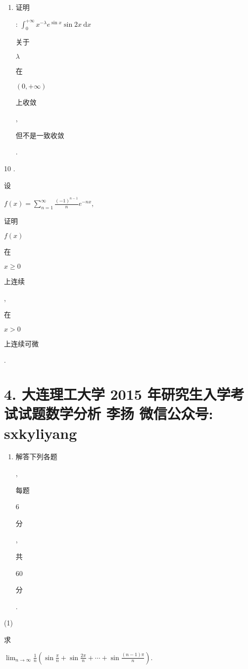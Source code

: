 \documentclass[10pt]{article}
\begin{document}
\begin{enumerate}
  \item \begin{CJK}{UTF8}{mj}证明\end{CJK}: $\int_{0}^{+\infty} x^{-\lambda} e^{\sin x} \sin 2 x \mathrm{~d} x$ \begin{CJK}{UTF8}{mj}关于\end{CJK} $\lambda$ \begin{CJK}{UTF8}{mj}在\end{CJK} $(0,+\infty)$ \begin{CJK}{UTF8}{mj}上收敛\end{CJK}, \begin{CJK}{UTF8}{mj}但不是一致收敛\end{CJK}.

\end{enumerate}
10 . \begin{CJK}{UTF8}{mj}设\end{CJK} $f(x)=\sum_{n=1}^{\infty} \frac{(-1)^{n-1}}{n} e^{-n x}$, \begin{CJK}{UTF8}{mj}证明\end{CJK} $f(x)$ \begin{CJK}{UTF8}{mj}在\end{CJK} $x \geqslant 0$ \begin{CJK}{UTF8}{mj}上连续\end{CJK}, \begin{CJK}{UTF8}{mj}在\end{CJK} $x>0$ \begin{CJK}{UTF8}{mj}上连续可微\end{CJK}.

\section{4. 大连理工大学 2015 年研究生入学考试试题数学分析 
 李扬 
 微信公众号: sxkyliyang}
\begin{enumerate}
  \item \begin{CJK}{UTF8}{mj}解答下列各题\end{CJK}, \begin{CJK}{UTF8}{mj}每题\end{CJK} 6 \begin{CJK}{UTF8}{mj}分\end{CJK}, \begin{CJK}{UTF8}{mj}共\end{CJK} 60 \begin{CJK}{UTF8}{mj}分\end{CJK}.
\end{enumerate}
(1) \begin{CJK}{UTF8}{mj}求\end{CJK} $\lim _{n \rightarrow \infty} \frac{1}{n}\left(\sin \frac{\pi}{n}+\sin \frac{2 \pi}{n}+\cdots+\sin \frac{(n-1) \pi}{n}\right)$.
\end{document}
